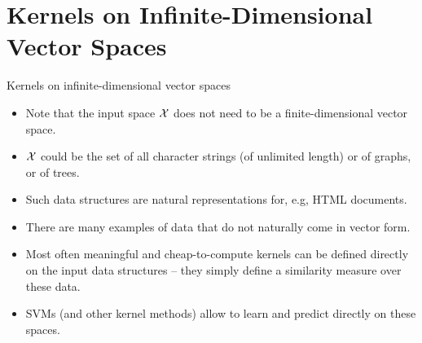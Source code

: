 \documentclass[11pt,compress,t,notes=noshow, xcolor=table]{beamer}
\begin{document}
\section{Kernels on Infinite-Dimensional Vector Spaces}

\begin{vbframe}{Kernels on infinite-dimensional vector spaces}

  \begin{itemize}
    \item Note that the input space $\mathcal{X}$ does not need to be a finite-dimensional
    vector space.
    \item $\mathcal{X}$ could be the set of all character strings (of unlimited length) or 
       of graphs, or of trees.
    \item Such data structures are natural representations for, e.g, HTML documents.
    \item There are many examples of data that do not naturally come in vector
    form.
    \item Most often meaningful and cheap-to-compute kernels can be defined
    directly on the input data structures -- they simply define a similarity measure over these data.
    \item SVMs (and other kernel methods) allow to learn and predict
    directly on these spaces.
  \end{itemize}


\end{vbframe}


\endlecture
\end{document}
